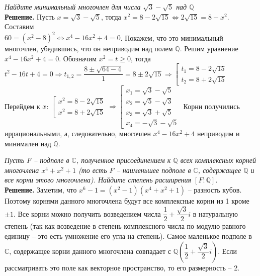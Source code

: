 \documentclass[a4paper, 12pt]{article}
\newcommand{\Q}{\mathbb{Q}}
\newcommand{\Co}{\mathbb{C}}
\begin{document}
\begin{spacing}{1}
\begin{center}
\end{center}

\noindent \textit{Найдите минимальный многочлен для числа $\sqrt{3}-\sqrt{5}$ над $\Q$
}\\
\noindent \textbf{Решение.} Пусть $x = \sqrt{3}-\sqrt{5}$, тогда $x^2 = 8 - 2\sqrt{15} \Leftrightarrow 2\sqrt{15} = 8-x^2$. Составим \\$60 = (x^2-8)^2 \Leftrightarrow x^4-16x^2+4 = 0$. Покажем, что это минимальный многочлен, убедившись, что он неприводим над полем $\Q$. Решим уравнение $x^4-16x^2+4 = 0$. Обозначим $x^2 = t \geq 0$, тогда $t^2 - 16t + 4 = 0 \Rightarrow t_{1,2} = \dfrac{8\pm\sqrt{64-4}}{1}=8\pm 2\sqrt{15}\Rightarrow 
\left[\begin{array}{l}
	t_1 = 8 - 2\sqrt{15}\\
	t_2 = 8 + 2\sqrt{15}
\end{array}\right.$ Перейдем к $x$: $\left[\begin{array}{l}
x^2 = 8 - 2\sqrt{15}\\
x^2 = 8 + 2\sqrt{15}
\end{array}\right.\Rightarrow \left[\begin{array}{l}
	x_1 = \sqrt{3}-\sqrt{5}\\
	x_2 = \sqrt{5}-\sqrt{3}\\
	x_3 = \sqrt{3}+\sqrt{5}\\
	x_4 = -\sqrt{3}-\sqrt{5}
\end{array}\right.$ Корни получились иррациональными, а, следовательно, многочлен $x^4-16x^2+4$ неприводим и минимален над $\Q$.


\begin{center}
\end{center}

\noindent \textit{Пусть $F$ -- подполе в $\Co$, полученное присоединением к $\Q$ всех комплексных корней многочлена $x^4+x^2+1$ (то есть $F$ -- наименьшее подполе в $\Co$, содержащее $\Q$ и все корни этого многочлена). Найдите степень расширения $[F:\Q]$.
}\\
\noindent \textbf{Решение.} Заметим, что $x^6 - 1 = (x^2 - 1)(x^4+x^2+1)$ -- разность кубов. Поэтому корнями данного многочлена будут все комплексные корни из 1 кроме $\pm 1$. Все корни можно получить возведением числа $\dfrac{1}{2} + \dfrac{\sqrt3}{2}i$ в натуральную степень (так как возведение в степень комплексного числа по модулю равного единицу -- это есть умножение его угла на степень). Самое маленькое подполе в $\Co$, содержащее корни данного многочлена совпадает с $\Q(\dfrac{1}{2} + \dfrac{\sqrt3}{2}i)$. Если рассматривать это поле как векторное пространство, то его размерность -- 2.
\begin{center}
\end{center}


\end{spacing}
\end{document}
